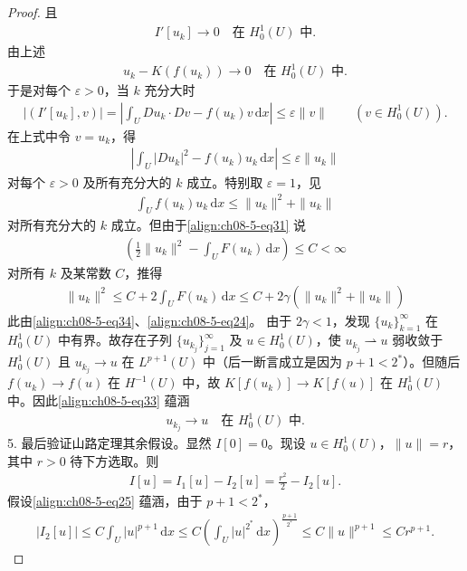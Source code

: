 \documentclass[../../main.tex]{subfiles}
\begin{document}
\begin{theorem}[存在性]
\begin{proof}
且
\begin{align}
I'[u_k]\to 0\quad\text{在 }H_0^1(U)\text{ 中}.\label{align:ch08-5-eq32}
\end{align}
由上述
\begin{align}
u_k-K(f(u_k))\to 0\quad\text{在 }H_0^1(U)\text{ 中}.\label{align:ch08-5-eq33}
\end{align}
于是对每个 $\varepsilon>0$，当 $k$ 充分大时
\begin{align*}
|(I'[u_k],v)|=\left|\int_U Du_k\cdot Dv-f(u_k)v\,\mathrm{d}x\right|\leqslant\varepsilon\|v\|\qquad (v\in H_0^1(U)).
\end{align*}
在上式中令 $v=u_k$，得
\begin{align*}
\left|\int_U|Du_k|^2-f(u_k)u_k\,\mathrm{d}x\right|\leqslant\varepsilon\|u_k\|
\end{align*}
对每个 $\varepsilon>0$ 及所有充分大的 $k$ 成立。特别取 $\varepsilon=1$，见
\begin{align}
\int_U f(u_k)u_k\,\mathrm{d}x\leqslant\|u_k\|^2+\|u_k\|\label{align:ch08-5-eq34}
\end{align}
对所有充分大的 $k$ 成立。但由于\eqref{align:ch08-5-eq31} 说
\begin{align*}
\left(\frac12\|u_k\|^2-\int_U F(u_k)\,\mathrm{d}x\right)\leqslant C<\infty
\end{align*}
对所有 $k$ 及某常数 $C$，推得
\begin{align*}
\|u_k\|^2\leqslant C+2\int_U F(u_k)\,\mathrm{d}x\leqslant C+2\gamma(\|u_k\|^2+\|u_k\|)
\end{align*}
此由\eqref{align:ch08-5-eq34}、\eqref{align:ch08-5-eq24}。
由于 $2\gamma<1$，发现 $\{u_k\}_{k=1}^\infty$ 在 $H_0^1(U)$ 中有界。故存在子列 $\{u_{k_j}\}_{j=1}^\infty$ 及 $u\in H_0^1(U)$，使 $u_{k_j}\rightharpoonup u$ 弱收敛于 $H_0^1(U)$ 且 $u_{k_j}\to u$ 在 $L^{p+1}(U)$ 中（后一断言成立是因为 $p+1<2^*$）。但随后 $f(u_k)\to f(u)$ 在 $H^{-1}(U)$ 中，故 $K[f(u_k)]\to K[f(u)]$ 在 $H_0^1(U)$ 中。因此\eqref{align:ch08-5-eq33} 蕴涵
\begin{align}
u_{k_j}\to u\quad\text{在 }H_0^1(U)\text{ 中}.\label{align:ch08-5-eq35}
\end{align}
5. 最后验证山路定理其余假设。显然 $I[0]=0$。现设 $u\in H_0^1(U)$，$\|u\|=r$，其中 $r>0$ 待下方选取。则
\begin{align}
I[u]=I_1[u]-I_2[u]=\frac{r^2}{2}-I_2[u].\label{align:ch08-5-eq36}
\end{align}
假设\eqref{align:ch08-5-eq25} 蕴涵，由于 $p+1<2^*$，
\begin{align*}
|I_2[u]|\leqslant C\int_U|u|^{p+1}\,\mathrm{d}x\leqslant C\left(\int_U|u|^{2^*}\,\mathrm{d}x\right)^{\frac{p+1}{2^*}}\leqslant C\|u\|^{p+1}\leqslant Cr^{p+1}.

\end{align*}
\end{proof}
\end{theorem}
\end{document}
